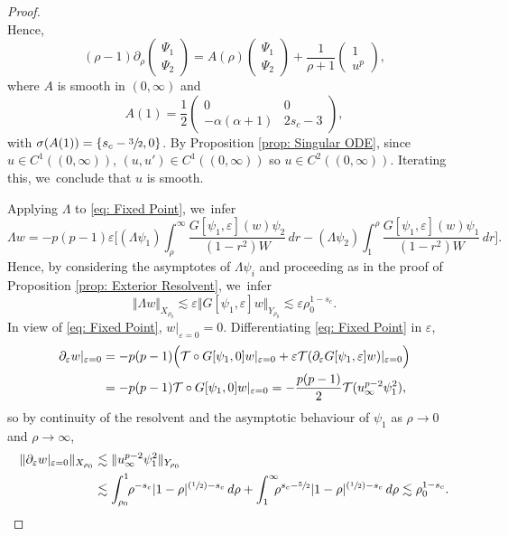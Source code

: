 \documentclass[JEP,XML,SOM,Unicode]{cedram}
\newcommand{\Psfrac}[2]{(\sfrac{#1}{#2})}
\theoremstyle{plain}
\theoremstyle{definition}
\begin{document}
\begin{proof}
\[\]
Hence,
\[
(\rho-1)\partial_\rho\begin{pmatrix} \Psi_1\\ \Psi_2\end{pmatrix} = A(\rho)\begin{pmatrix} \Psi_1\\ \Psi_2\end{pmatrix} +\frac{1}{\rho+1}\begin{pmatrix} 1\\u^p\end{pmatrix},
\]
where $A$ is smooth in $(0,\infty)$ and
\[
A(1)=\frac{1}{2}
\begin{pmatrix}
0 & 0\\
-\alpha(\alpha+1) & 2s_c-3
\end{pmatrix},
\]
with $\sigma(A(1))=\{s_c-\sfrac{3}{2},0\}$. By Proposition \ref{prop: Singular ODE}, since $u\in C^1((0,\infty))$, $(u,u')\in C^1((0,\infty))$ so $u\in C^2((0,\infty))$. Iterating this, we~conclude that $u$ is smooth.

Applying $\Lambda$ to \eqref{eq: Fixed Point}, we~infer
\[
\Lambda w=-p(p-1)\varepsilon \bigg[(\Lambda \psi_1)\int_{\rho}^\infty \frac{G[\psi_1,\varepsilon](w)\psi_2}{(1-r^2)W}\,dr-(\Lambda\psi_2)\int_1^\rho \frac{G[\psi_1,\varepsilon](w)\psi_1}{(1-r^2)W}\,dr\bigg].
\]
Hence, by considering the asymptotes of $\Lambda \psi_i$ and proceeding as in the proof of Proposition \ref{prop: Exterior Resolvent}, we~infer
\[
\Vert\Lambda w\Vert_{X_{\rho_0}}\lesssim \varepsilon \Vert G[\psi_1,\varepsilon]w\Vert_{Y_{\rho_0}}\lesssim \varepsilon \rho_0^{1-s_c}.
\]
In view of \eqref{eq: Fixed Point}, $w|_{\varepsilon=0}=0$. Differentiating \eqref{eq: Fixed Point} in $\varepsilon$,
\[
\begin{aligned}
\partial_{\varepsilon}w|_{\varepsilon=0}&=-p(p-1)\Bigl(\mathcal T\circ G[\psi_1,0]w|_{\varepsilon=0}+\varepsilon\mathcal T(\partial_{\varepsilon}G[\psi_1,\varepsilon]w)|_{\varepsilon=0}\Bigr)\\
&=-p(p-1) \mathcal T\circ G[\psi_1,0]w|_{\varepsilon=0}= -\frac{p(p-1)}{2}\mathcal T(u_\infty^{p-2}\psi_1^2),
\end{aligned}
\]
so by continuity of the resolvent and the asymptotic behaviour of $\psi_1$ as $\rho\to 0$ and $\rho\to\infty$,
\begin{align*}
\Vert \partial_{\varepsilon}w|_{\varepsilon=0}\Vert_{X_{\rho_0}}&\lesssim \Vert u_\infty^{p-2}\psi_1^2\Vert_{Y_{\rho_0}}\\
&\lesssim \int_{\rho_0}^1\hspace*{-1mm}\rho^{-s_c}|1-\rho|^{\Psfrac{1}{2}-s_c}\,d\rho+ \int_1^\infty\hspace*{-2mm}\rho^{s_c-\sfrac{5}{2}}|1-\rho|^{\Psfrac{1}{2}-s_c}\,d\rho\lesssim \rho_0^{1-s_c}.\qedhere
\end{align*}
\end{proof}
\end{document}
